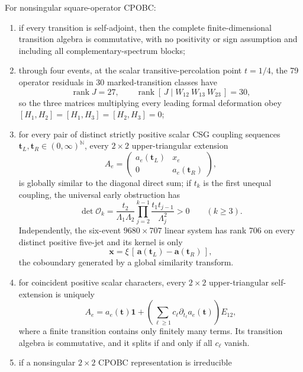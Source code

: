 \begin{theorem}
\label{thm:bcgr-rigidity}
For nonsingular square-operator CPOBC:
\begin{enumerate}
\item if every transition is self-adjoint, then the complete
finite-dimensional transition algebra is commutative, with no positivity
or sign assumption and including all complementary-spectrum blocks;
\item through four events, at the scalar transitive-percolation point
\(t=1/4\), the 79 operator residuals in 30 marked-transition classes have
\begin{equation}
 \operatorname{rank}J=27,\qquad
 \operatorname{rank}[\,J\mid W_{12}\ W_{13}\ W_{23}\,]=30,
\label{eq:bcgr-ranks}
\end{equation}
so the three matrices multiplying every leading formal deformation obey
\([H_1,H_2]=[H_1,H_3]=[H_2,H_3]=0\);
\item for every pair of distinct strictly positive scalar CSG coupling
sequences \(\bm t_L,\bm t_R\in(0,\infty)^{\mathbb N}\), every
\(2\times2\) upper-triangular extension
\[
 A_e=
 \begin{pmatrix}
 a_e(\bm t_L)&x_e\\0&a_e(\bm t_R)
 \end{pmatrix},
\]
is globally similar to the diagonal direct sum; if \(t_k\) is the first
unequal coupling, the universal early obstruction has
\begin{equation}
\det\mathcal O_k=
\frac{t_2}{\Lambda_1\Lambda_2}
\prod_{j=2}^{k-1}\frac{t_1t_{j-1}}{\Lambda_j^2}>0
\qquad(k\ge3).
\label{eq:bcgr-allorder-det}
\end{equation}
Independently, the six-event \(9680\times707\) linear system has rank 706
on every distinct positive five-jet and its kernel is only
\[
 \bm x=\xi\,[\,\bm a(\bm t_L)-\bm a(\bm t_R)\,],
\]
the coboundary generated by a global similarity transform.
\item for coincident positive scalar characters, every \(2\times2\)
upper-triangular self-extension is uniquely
\begin{equation}
 A_e=a_e(\bm t)\mathbf1+
 \left(\sum_{\ell\ge1}c_\ell\partial_{t_\ell}a_e(\bm t)\right)E_{12},
\label{eq:bcgr-equal-character}
\end{equation}
where a finite transition contains only finitely many terms.  Its
transition algebra is commutative, and it splits if and only if all
\(c_\ell\) vanish.
\item if a nonsingular \(2\times2\) CPOBC representation is irreducible

\end{enumerate}
\end{theorem}
